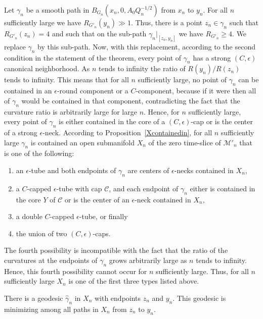  Let
$\gamma_n$ be a smooth path in $B_{G_n}(x_n,0,A_0Q_n^{-1/2})$ from
$x_n$ to $y_n$. For all $n$ sufficiently large we have
$R_{G'_n}(y_n) \gg 1$. Thus, there is a point $z_n\in \gamma_n$ such
that $R_{G'_n}(z_n)=4$ and such that on the sub-path
$\gamma_n|_{[z_n,y_n]}$ we have $R_{G'_n}\ge 4$. We replace
$\gamma_n$ by this sub-path. Now, with this replacement, according
to the second condition in the statement of the theorem, every point
of $\gamma_n$ has a strong $(C,\epsilon)$ canonical
neighborhood. As $n$ tends to infinity
the ratio of $R(y_n)/R(z_n)$ tends to infinity. This means that for
all $n$ sufficiently large, no point of  $\gamma_n$ can be contained
in an $\epsilon$-round component
or a $C$-component, because if it were then all
of $\gamma_n$ would be contained in that component, contradicting
the fact that the curvature ratio is arbitrarily large for large
$n$. Hence, for $n$ sufficiently large, every point of $\gamma_n$ is
either contained in the core of a
$(C,\epsilon)$-cap or is the center of a
strong $\epsilon$-neck. According to
Proposition~\ref{Xcontainedin}, for all $n$ sufficiently large
$\gamma_n$ is contained an open submanifold $X_n$ of the zero
time-slice of ${\mathcal M}'_n$ that is one of the following:
\begin{enumerate}
\item[(1)] an $\epsilon$-tube  and both endpoints of $\gamma_n$ are centers
of $\epsilon$-necks
contained in $X_n$,
\item[(2)] a $C$-capped $\epsilon$-tube with cap ${\mathcal C}$,
and each endpoint of $\gamma_n$ either is contained in the core $Y$
of ${\mathcal C}$ or is the center of an $\epsilon$-neck contained
in $X_n$,
\item[(3)] a double $C$-capped $\epsilon$-tube, or finally
\item[(4)] the union of two $(C,\epsilon)$-caps.
\end{enumerate}

The fourth possibility is incompatible with the fact that the ratio
of the curvatures at the endpoints of $\gamma_n$ grows arbitrarily
large as $n$ tends to infinity. Hence, this fourth possibility
cannot occur for $n$ sufficiently large. Thus, for all $n$
sufficiently large $X_n$ is one of the first three types listed
above.

\begin{claim}
\label{claim:minimizing-geodesic-in-Xn}
There is a geodesic $\hat\gamma_n$ in $X_n$ with endpoints $z_n$ and
$y_n$. This geodesic is minimizing among all paths in $X_n$ from
$z_n$ to $y_n$.
\end{claim}

